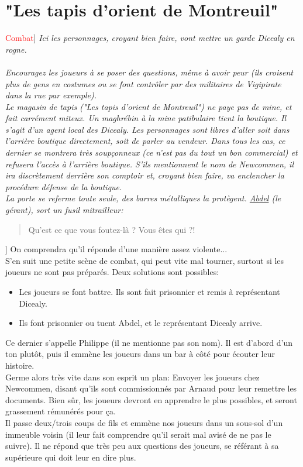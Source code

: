 \documentclass[10pt,a4paper,twocolumn]{article}
\newenvironment{lAbstract}[1]{{[}\textcolor{red}{#1}{]}\itshape}{\\ \\}
\begin{document}
\section{"Les tapis d'orient de Montreuil"}
\begin{lAbstract}{Combat}
Ici les personnages, croyant bien faire, vont mettre un garde Dicealy en rogne.
\end{lAbstract}
Encouragez les joueurs à se poser des questions, même à avoir peur (ils croisent plus de gens en costumes ou se font contrôler par des militaires de Vigipirate dans la rue par exemple). \\
Le magasin de tapis ("Les tapis d'orient de Montreuil") ne paye pas de mine, et fait carrément miteux. Un maghrébin à la mine patibulaire tient la boutique. Il s'agit d'un agent local des Dicealy. Les personnages sont libres d'aller soit dans l'arrière boutique directement, soit de parler au vendeur. Dans tous les cas, ce dernier se montrera très soupçonneux (ce n'est pas du tout un bon commercial) et refusera l'accès à l'arrière boutique. S'ils mentionnent le nom de Newcommen, il ira discrètement derrière son comptoir et, croyant bien faire, va enclencher la procédure défense de la boutique.\\
La porte se referme toute seule, des barres métalliques la protègent. \hyperlink{abdel}{Abdel} (le gérant), sort un fusil mitrailleur:
\begin{quote}
Qu'est ce que vous foutez-là ? Vous êtes qui ?!
\end{quote}{]}
On comprendra qu'il réponde d'une manière assez violente... \\
S'en suit une petite scène de combat, qui peut vite mal tourner, surtout si les joueurs ne sont pas préparés. Deux solutions sont possibles:
\begin{itemize}
	\item Les joueurs se font battre. Ils sont fait prisonnier et remis à représentant Dicealy.
	\item Ils font prisonnier ou tuent Abdel, et le représentant Dicealy arrive.
\end{itemize}
Ce dernier s'appelle Philippe (il ne mentionne pas son nom). Il est d'abord d'un ton plutôt, puis il emmène les joueurs dans un bar à côté pour écouter leur histoire.\\
Germe alors très vite dans son esprit un plan: Envoyer les joueurs chez Newcommen, disant qu'ils sont commissionnés par Arnaud pour leur remettre les documents. Bien sûr, les joueurs devront en apprendre le plus possibles, et seront grassement rémunérés pour ça. \\
Il passe deux/trois coups de fils et emmène nos joueurs dans un sous-sol d'un immeuble voisin (il leur fait comprendre qu'il serait mal avisé de ne pas le suivre). Il ne répond que très peu aux questions des joueurs, se référant à sa supérieure qui doit leur en dire plus.
\end{document}
